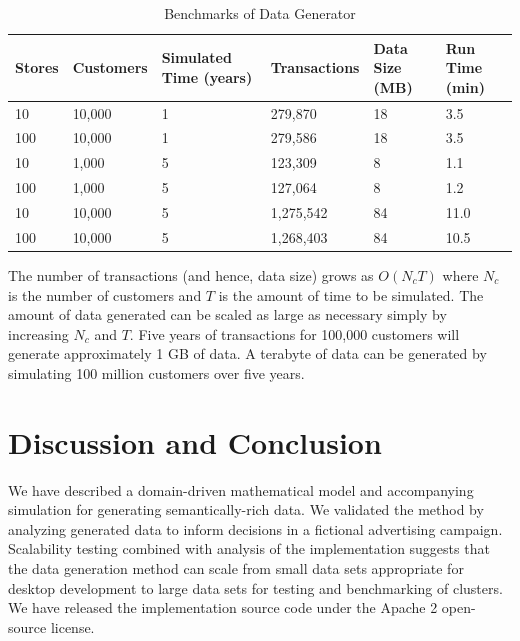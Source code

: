 \documentclass[conference]{IEEEtran}
\begin{document}
\begin{table}[!t]
\renewcommand{\arraystretch}{1.3}
\caption{Benchmarks of Data Generator}
\label{tab:benchmarks}
\centering
\begin{tabular}{|p{0.75cm}||p{1.2cm}||p{1cm}||p{1.25cm}||p{1cm}||p{1cm}|}
\hline
Stores & Customers & Simulated Time (years) & Transactions & Data Size (MB) & Run Time (min)\\ \hline
10 & 10,000 & 1 & 279,870 & 18 & 3.5 \\ \hline
100 & 10,000 & 1 & 279,586 & 18 & 3.5 \\ \hline
10 & 1,000 & 5 & 123,309 & 8 & 1.1 \\ \hline
100 & 1,000 & 5 & 127,064 & 8 & 1.2 \\ \hline
10 & 10,000 & 5 & 1,275,542 & 84 & 11.0 \\ \hline
100 & 10,000 & 5 & 1,268,403 & 84 & 10.5 \\ \hline
\end{tabular}
\end{table}

The number of transactions (and hence, data size) grows as $O(N_c T)$ where $N_c$ is the number of customers and $T$ is the amount of time to be simulated. The amount of data generated can be scaled as large as necessary simply by increasing $N_c$ and $T$. Five years of transactions for 100,000 customers will generate approximately 1 GB of data. A terabyte of data can be generated by simulating 100 million customers over five years. 

\section{Discussion and Conclusion}
We have described a domain-driven mathematical model and accompanying simulation for generating semantically-rich data.  We validated the method by analyzing generated data to inform decisions in a fictional advertising campaign. Scalability testing combined with analysis of the implementation suggests that the data generation method can scale from small data sets appropriate for desktop development to large data sets for testing and benchmarking of clusters. We have released the implementation source code under the Apache 2 open-source license.
\end{document}
